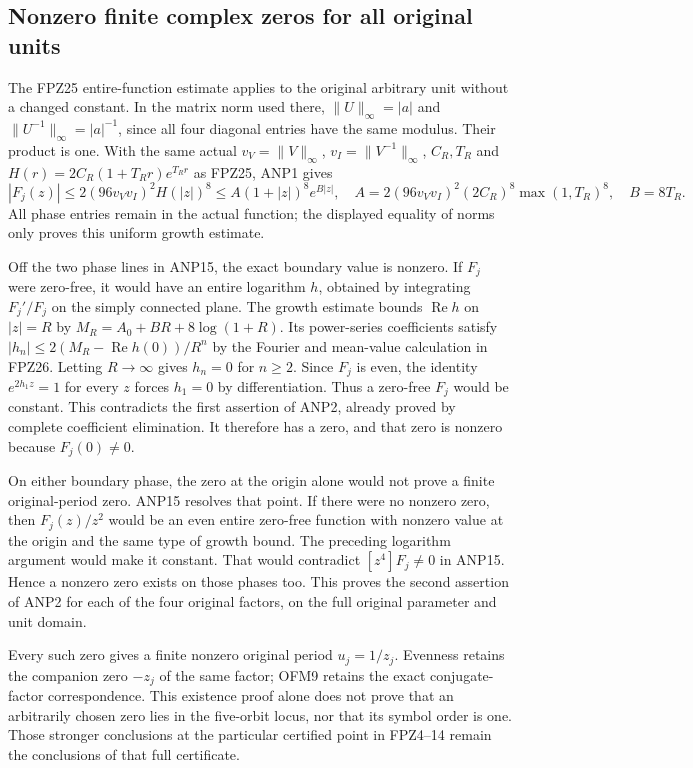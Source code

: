 \documentclass[11pt]{article}
\begin{document}
\subsection{Nonzero finite complex zeros for all original units}
The FPZ25 entire-function estimate applies to the original arbitrary
unit without a changed constant. In the matrix norm used there,
$\|U\|_\infty=|a|$ and $\|U^{-1}\|_\infty=|a|^{-1}$, since
all four diagonal entries have the same modulus. Their product is one.
With the same actual $v_V=\|V\|_\infty$, $v_I=\|V^{-1}\|_\infty$,
$C_R,T_R$ and $H(r)=2C_R(1+T_Rr)e^{T_Rr}$ as FPZ25, ANP1 gives
\[
 |F_j(z)|\le2(96v_Vv_I)^2H(|z|)^8
          \le A(1+|z|)^8e^{B|z|},
 \quad
 A=2(96v_Vv_I)^2(2C_R)^8\max(1,T_R)^8,\quad B=8T_R.
 \tag{ANP16}
\]
All phase entries remain in the actual function; the displayed
equality of norms only proves this uniform growth estimate.

Off the two phase lines in ANP15, the exact boundary value is nonzero.
If $F_j$ were zero-free, it would have an entire logarithm $h$,
obtained by integrating $F_j'/F_j$ on the simply connected plane.
The growth estimate bounds $\operatorname{Re}h$ on $|z|=R$ by
$M_R=A_0+BR+8\log(1+R)$. Its power-series coefficients satisfy
$|h_n|\le2(M_R-\operatorname{Re}h(0))/R^n$ by the Fourier and
mean-value calculation in FPZ26. Letting $R\to\infty$ gives
$h_n=0$ for $n\ge2$. Since $F_j$ is even, the identity
$e^{2h_1z}=1$ for every $z$ forces $h_1=0$ by differentiation.
Thus a zero-free $F_j$ would be constant. This contradicts the first
assertion of ANP2, already proved by complete coefficient elimination.
It therefore has a zero, and that zero is nonzero because $F_j(0)\ne0$.

On either boundary phase, the zero at the origin alone would not
prove a finite original-period zero. ANP15 resolves that point.
If there were no nonzero zero, then $F_j(z)/z^2$ would be an even
entire zero-free function with nonzero value at the origin and the
same type of growth bound. The preceding logarithm argument would
make it constant. That would contradict $[z^4]F_j\ne0$ in ANP15.
Hence a nonzero zero exists on those phases too.
This proves the second assertion of ANP2 for each of the four
original factors, on the full original parameter and unit domain.

Every such zero gives a finite nonzero original period $u_j=1/z_j$.
Evenness retains the companion zero $-z_j$ of the same factor;
OFM9 retains the exact conjugate-factor correspondence.
This existence proof alone does not prove that an arbitrarily chosen
zero lies in the five-orbit locus, nor that its symbol order is one.
Those stronger conclusions at the particular certified point in
FPZ4--14 remain the conclusions of that full certificate.
\end{document}
